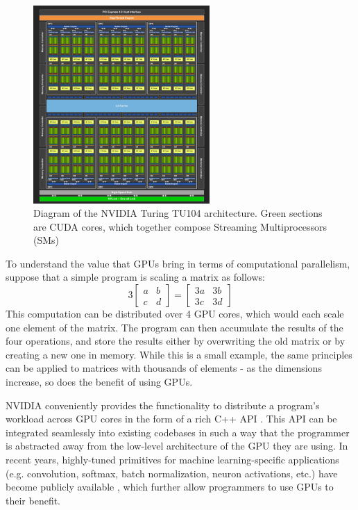\documentclass[12pt,letterpaper]{article}
\begin{document}
\begin{figure}[h]
\centering
\includegraphics[width=0.6\textwidth]{Turing_TU104_chip_diagram.png}
\captionsetup{width=0.8\linewidth}
\caption{Diagram of the NVIDIA Turing TU104 architecture. Green sections are CUDA cores, which together compose Streaming Multiprocessors (SMs) \cite{turing_architecture}}
\label{fig:turing}
\end{figure}

To understand the value that GPUs bring in terms of computational parallelism, suppose that a simple program is scaling a matrix as follows:
\[
3
\begin{bmatrix}
    a  &  b      \\
    c  &  d      
\end{bmatrix} 
=
\begin{bmatrix}
    3a  &  3b      \\
    3c  &  3d      
\end{bmatrix} 
\]
This computation can be distributed over 4 GPU cores, which would each scale one element of the matrix. The program can then accumulate the results of the four operations, and store the results either by overwriting the old matrix or by creating a new one in memory. While this is a small example, the same principles can be applied to matrices with thousands of elements - as the dimensions increase, so does the benefit of using GPUs. 
\par

NVIDIA conveniently provides the functionality to distribute a program's workload across GPU cores in the form of a rich C++ API \cite{cuda_guide}. This API can be integrated seamlessly into existing codebases in such a way that the programmer is abstracted away from the low-level architecture of the GPU they are using. In recent years, highly-tuned primitives for machine learning-specific applications (e.g. convolution, softmax, batch normalization, neuron activations, etc.) have become publicly available \cite{cudnn}, which further allow programmers to use GPUs to their benefit.
\par 
\end{document}
